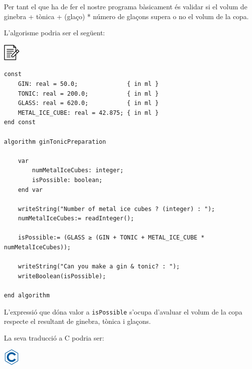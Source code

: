 \documentclass[]{book}
\begin{document}
Per tant el que ha de fer el nostre programa bàsicament és validar si el
volum de ginebra + tònica + (glaço) * número de glaçons supera o no el
volum de la copa.

L'algorisme podria ser el següent:

\includegraphics{./img/alg.png}

\begin{verbatim}
const
    GIN: real = 50.0;              { in ml }
    TONIC: real = 200.0;           { in ml }
    GLASS: real = 620.0;           { in ml }
    METAL_ICE_CUBE: real = 42.875; { in ml }
end const

algorithm ginTonicPreparation

    var
        numMetalIceCubes: integer;
        isPossible: boolean;
    end var

    writeString("Number of metal ice cubes ? (integer) : ");
    numMetalIceCubes:= readInteger();

    isPossible:= (GLASS ≥ (GIN + TONIC + METAL_ICE_CUBE * numMetalIceCubes));

    writeString("Can you make a gin & tonic? : ");
    writeBoolean(isPossible);

end algorithm
\end{verbatim}

L'expressió que dóna valor a \texttt{isPossible} s'ocupa d'avaluar el
volum de la copa respecte el resultant de ginebra, tònica i glaçons.

La seva traducció a C podria ser:

\includegraphics{./img/c.png}
\end{document}
